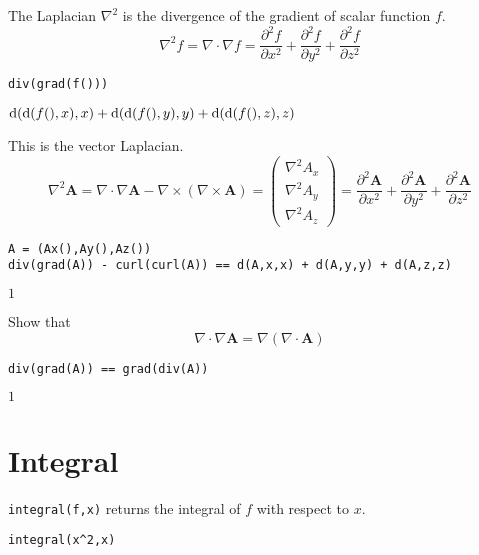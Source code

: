 \documentclass[12pt]{article}
\begin{document}
The Laplacian $\nabla^2$ is the divergence of the gradient of scalar function $f$.
\begin{equation*}
\nabla^2f=\nabla\cdot\nabla f
=\frac{\partial^2 f}{\partial x^2}
+\frac{\partial^2 f}{\partial y^2}
+\frac{\partial^2 f}{\partial z^2}
\end{equation*}

{\color{blue}
\begin{verbatim}
div(grad(f()))
\end{verbatim}}

$\displaystyle
\operatorname{\rm d}(\operatorname{\rm d}(f(),x),x)
+\operatorname{\rm d}(\operatorname{\rm d}(f(),y),y)
+\operatorname{\rm d}(\operatorname{\rm d}(f(),z),z)
$

\bigskip
This is the vector Laplacian.
\begin{equation*}
\nabla^2\mathbf A
=\nabla\cdot\nabla\mathbf A-\nabla\times(\nabla\times\mathbf A)
=\begin{pmatrix}
\nabla^2A_x
\\
\nabla^2A_y
\\
\nabla^2A_z
\end{pmatrix}
=\frac{\partial^2\mathbf A}{\partial x^2}
+\frac{\partial^2\mathbf A}{\partial y^2}
+\frac{\partial^2\mathbf A}{\partial z^2}
\end{equation*}

{\color{blue}
\begin{verbatim}
A = (Ax(),Ay(),Az())
div(grad(A)) - curl(curl(A)) == d(A,x,x) + d(A,y,y) + d(A,z,z)
\end{verbatim}}

$1$

\bigskip
Show that
\begin{equation*}
\nabla\cdot\nabla\mathbf A=\nabla(\nabla\cdot\mathbf A)
\end{equation*}

{\color{blue}
\begin{verbatim}
div(grad(A)) == grad(div(A))
\end{verbatim}}

$1$

\newpage

\section{Integral}

\verb$integral(f,x)$ returns the integral of $f$ with respect to $x$.

{\color{blue}
\begin{verbatim}
integral(x^2,x)
\end{verbatim}
}
\end{document}

